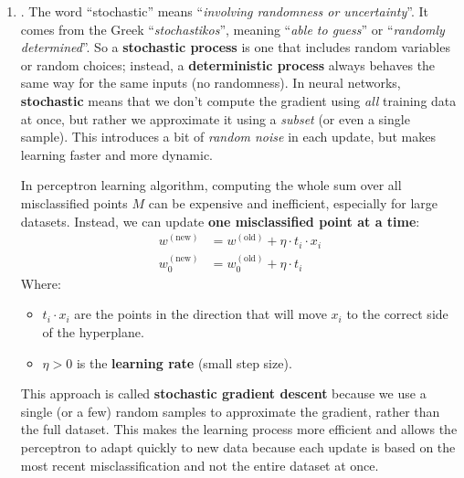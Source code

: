 \begin{enumerate}
    \item {}. The word ``stochastic'' means ``\emph{involving randomness or uncertainty}''. It comes from the Greek ``\emph{stochastikos}'', meaning ``\emph{able to guess}'' or ``\emph{randomly determined}''. So a \textbf{stochastic process} is one that includes random variables or random choices; instead, a \textbf{deterministic process} always behaves the same way for the same inputs (no randomness). In neural networks, \textbf{stochastic} means that we don't compute the gradient using \emph{all} training data at once, but rather we approximate it using a \emph{subset} (or even a single sample). This introduces a bit of \emph{random noise} in each update, but makes learning faster and more dynamic.
    
    \highspace
    In perceptron learning algorithm, computing the whole sum over all misclassified points $M$ can be expensive and inefficient, especially for large datasets. Instead, we can update \textbf{one misclassified point at a time}:
    \begin{align*}
        w^{\left(\text{new}\right)} &= w^{\left(\text{old}\right)} + \eta \cdot t_i \cdot x_i \\[.3em]
        w_0^{\left(\text{new}\right)} &= w_0^{\left(\text{old}\right)} + \eta \cdot t_i
    \end{align*}
    Where:
    \begin{itemize}
        \item $t_i \cdot x_i$ are the points in the direction that will move $x_i$ to the correct side of the hyperplane.
        \item $\eta > 0$ is the \textbf{learning rate} (small step size).
    \end{itemize}
    This approach is called \textbf{stochastic gradient descent} because we use a single (or a few) random samples to approximate the gradient, rather than the full dataset. This makes the learning process more efficient and allows the perceptron to adapt quickly to new data because each update is based on the most recent misclassification and not the entire dataset at once.


\end{enumerate}
